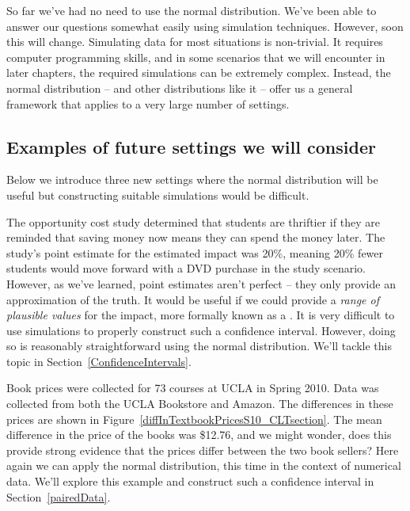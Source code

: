 So far we've had no need to use the normal distribution. We've been able to answer our questions somewhat easily using simulation techniques. However, soon this will change. Simulating data for most situations is non-trivial. It requires computer programming skills, and in some scenarios that we will encounter in later chapters, the required simulations can be extremely complex. Instead, the normal distribution -- and other distributions like it -- offer us a general framework that applies to a very large number of settings.


\subsection{Examples of future settings we will consider}

Below we introduce three new settings where the normal distribution will be useful but constructing suitable simulations would be difficult.

\begin{example}{The opportunity cost study determined that students are thriftier if they are reminded that saving money now means they can spend the money later. The study's point estimate for the estimated impact was 20\%, meaning 20\% fewer students would move forward with a DVD purchase in the study scenario. However, as we've learned, point estimates aren't perfect -- they only provide an approximation of the truth.}
It would be useful if we could provide a \emph{range of plausible values} for the impact, more formally known as a . It is very difficult to use simulations to properly construct such a confidence interval. However, doing so is reasonably straightforward using the normal distribution. We'll tackle this topic in Section~\ref{ConfidenceIntervals}.
\end{example}

\begin{example}{Book prices were collected for 73 courses at UCLA in Spring 2010. Data was collected from both the UCLA Bookstore and Amazon. The differences in these prices are shown in Figure~\ref{diffInTextbookPricesS10_CLTsection}. The mean difference in the price of the books was \$12.76, and we might wonder, does this provide strong evidence that the prices differ between the two book sellers?}
Here again we can apply the normal distribution, this time in the context of numerical data. We'll explore this example and construct such a confidence interval in Section~\ref{pairedData}.
\end{example}

